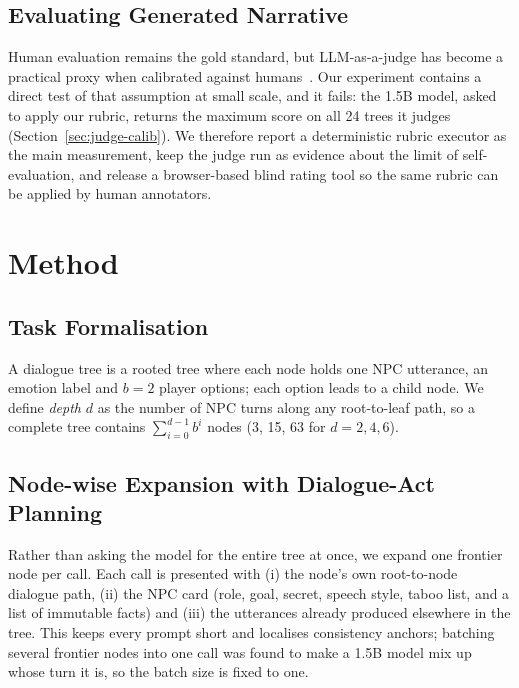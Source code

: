\documentclass[conference]{IEEEtran}
\begin{document}
\subsection{Evaluating Generated Narrative}
Human evaluation remains the gold standard, but LLM-as-a-judge has become a practical proxy when
calibrated against humans~\cite{mtbench2023}. Our experiment contains a direct test of that
assumption at small scale, and it fails: the 1.5B model, asked to apply our rubric, returns the
maximum score on all 24 trees it judges (Section~\ref{sec:judge-calib}). We therefore report a
deterministic rubric executor as the main measurement, keep the judge run as evidence about the
limit of self-evaluation, and release a browser-based blind rating tool so the same rubric can be
applied by human annotators.

\section{Method}
\subsection{Task Formalisation}
A dialogue tree is a rooted tree where each node holds one NPC utterance, an emotion label and
$b=2$ player options; each option leads to a child node. We define \emph{depth} $d$ as the number
of NPC turns along any root-to-leaf path, so a complete tree contains $\sum_{i=0}^{d-1} b^{i}$
nodes (3, 15, 63 for $d=2,4,6$).

\subsection{Node-wise Expansion with Dialogue-Act Planning}
Rather than asking the model for the entire tree at once, we expand one frontier node per call.
Each call is presented with (i) the node's own root-to-node dialogue path, (ii) the NPC card
(role, goal, secret, speech style, taboo list, and a list of immutable facts) and (iii) the
utterances already produced elsewhere in the tree. This keeps every prompt short and localises
consistency anchors; batching several frontier nodes into one call was found to make a 1.5B model
mix up whose turn it is, so the batch size is fixed to one.
\end{document}

